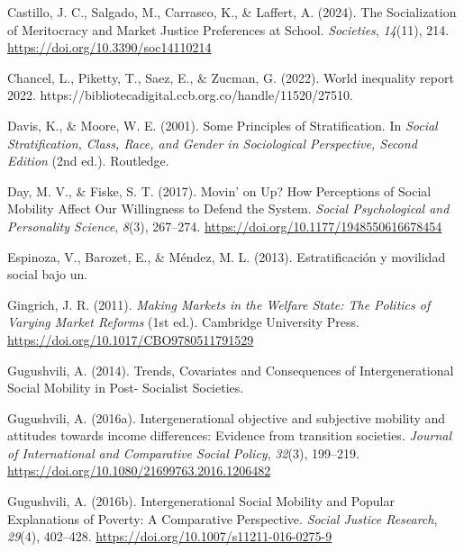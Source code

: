\documentclass[
  12pt,
]{article}
\newlength{\cslhangindent}
\newenvironment{CSLReferences}[2] %
 {\begin{list}{}{%
  \setlength{\itemindent}{0pt}
  \setlength{\leftmargin}{0pt}
  \setlength{\parsep}{0pt}
  \ifodd #1
   \setlength{\leftmargin}{\cslhangindent}
   \setlength{\itemindent}{-1\cslhangindent}
  \fi
  \setlength{\itemsep}{#2\baselineskip}}}
 {\end{list}}
\begin{document}
\begin{CSLReferences}{1}{0}
Castillo, J. C., Salgado, M., Carrasco, K., \& Laffert, A. (2024). The
{Socialization} of {Meritocracy} and {Market Justice Preferences} at
{School}. \emph{Societies}, \emph{14}(11), 214.
\url{https://doi.org/10.3390/soc14110214}

Chancel, L., Piketty, T., Saez, E., \& Zucman, G. (2022). World
inequality report 2022.
https://bibliotecadigital.ccb.org.co/handle/11520/27510.

Davis, K., \& Moore, W. E. (2001). Some {Principles} of
{Stratification}. In \emph{Social {Stratification}, {Class}, {Race}, and
{Gender} in {Sociological Perspective}, {Second Edition}} (2nd ed.).
Routledge.

Day, M. V., \& Fiske, S. T. (2017). Movin' on {Up}? {How Perceptions} of
{Social Mobility Affect Our Willingness} to {Defend} the {System}.
\emph{Social Psychological and Personality Science}, \emph{8}(3),
267--274. \url{https://doi.org/10.1177/1948550616678454}

Espinoza, V., Barozet, E., \& Méndez, M. L. (2013). {Estratificaci{ó}n y
movilidad social bajo un}.

Gingrich, J. R. (2011). \emph{Making {Markets} in the {Welfare State}:
{The Politics} of {Varying Market Reforms}} (1st ed.). Cambridge
University Press. \url{https://doi.org/10.1017/CBO9780511791529}

Gugushvili, A. (2014). Trends, {Covariates} and {Consequences} of
{Intergenerational Social Mobility} in {Post- Socialist Societies}.

Gugushvili, A. (2016a). Intergenerational objective and subjective
mobility and attitudes towards income differences: Evidence from
transition societies. \emph{Journal of International and Comparative
Social Policy}, \emph{32}(3), 199--219.
\url{https://doi.org/10.1080/21699763.2016.1206482}

Gugushvili, A. (2016b). Intergenerational {Social Mobility} and {Popular
Explanations} of {Poverty}: {A Comparative Perspective}. \emph{Social
Justice Research}, \emph{29}(4), 402--428.
\url{https://doi.org/10.1007/s11211-016-0275-9}


\end{CSLReferences}
\end{document}
